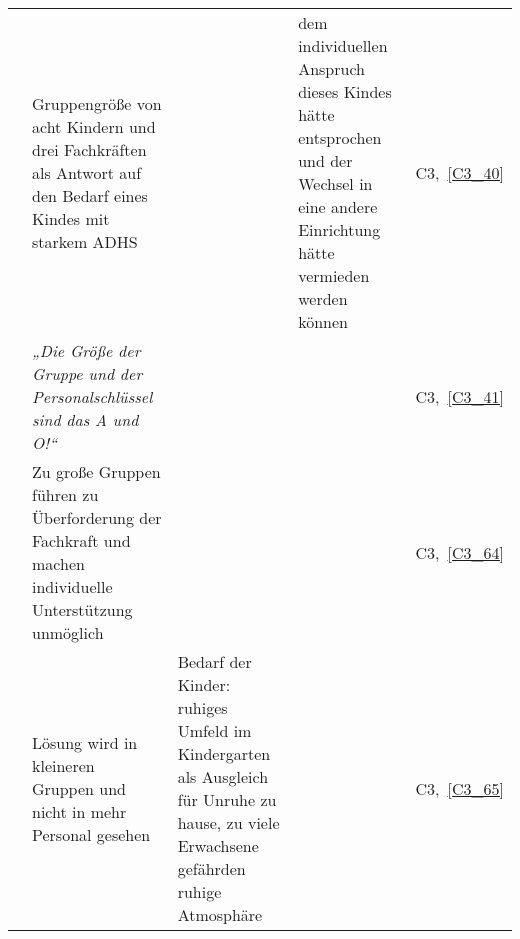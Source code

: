 \begin{landscape}
\begin{small}
\begin{centering}
\begin{longtable}{p{2cm}p{8.5cm}p{4cm}p{4cm}p{1.5cm}}
\cmidrule{2 - 5}
& Gruppengröße von acht Kindern und drei Fachkräften als Antwort auf den Bedarf eines Kindes mit starkem ADHS & & dem individuellen Anspruch dieses Kindes hätte entsprochen und der Wechsel in eine andere Einrichtung hätte vermieden werden können & C3,~\ref{C3_40}\\
\cmidrule{2 - 5}
& \emph{„Die Größe der Gruppe und der Personalschlüssel sind das A und O!“} & & & C3,~\ref{C3_41}\\
\cmidrule{2 - 5}
& Zu große Gruppen führen zu Überforderung der Fachkraft und machen individuelle Unterstützung unmöglich & & & C3,~\ref{C3_64}\\
\cmidrule{2 - 5}
& Lösung wird in kleineren Gruppen und nicht in mehr Personal gesehen & Bedarf der Kinder: ruhiges Umfeld im Kindergarten als Ausgleich für Unruhe zu hause, zu viele Erwachsene gefährden ruhige Atmosphäre & & C3,~\ref{C3_65}\\
\end{longtable}
\end{centering}


\end{small}
\end{landscape}
